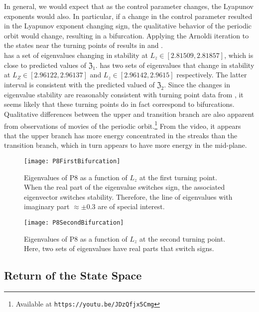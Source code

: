 In general, we would expect that as the control parameter changes, the Lyapunov exponents would also. In particular, if a change in the control parameter resulted in the Lyapunov exponent changing sign, the qualitative behavior of the periodic orbit would change, resulting in a bifurcation. Applying the Arnoldi iteration to the states near the turning points of  results in  and . \\
\clearpage
  has a set of eigenvalues changing in stability at $L_z \in [2.81509, 2.81857]$, which is close to predicted values of $\mathfrak{Z}_1$.  has two sets of eigenvalues that change in stability at $L_Z \in  [2.96122,2.96137]$ and $L_z \in [ 2.96142,2.9615]$ respectively. The latter interval is consistent with the predicted valued of $\mathfrak{Z}_2$. Since the changes in eigenvalue stability are reasonably consistent with turning point data from , it seems likely that these turning points do in fact correspond to bifurcations. Qualitative differences between the upper and transition branch are also apparent from observations of movies of the periodic orbit.\footnote{Available at {\tt https://youtu.be/JDzQfjx5Cmg}} From the video, it appears that the upper branch has more energy concentrated in the streaks than the transition branch, which in turn appears to have more energy in the mid-plane. \\

\begin{figure}[t]
\texttt{[image: P8FirstBifurcation]}
\caption{Eigenvalues of P8 as a function of $L_z$ at the first turning point. When the real part of the eigenvalue switches sign, the associated eigenvector switches stability. Therefore, the line of eigenvalues with imaginary part  $\approx \pm 0.3$ are of special interest.}\label{fig:P8FirstBifurcation}
\end{figure}


\begin{figure}[h]
\texttt{[image: P8SecondBifurcation]}
\caption{Eigenvalues of P8 as a function of $L_z$ at the second turning point. Here, two sets of eigenvalues have real parts that switch signs. }\label{fig:P8SecondBifurcation}
\end{figure}

\subsection{Return of the State Space}

